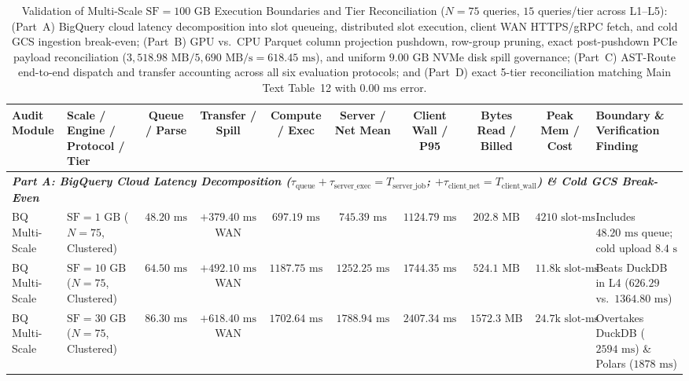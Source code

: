 \documentclass[10pt,a4paper]{article}
\newenvironment{fitasttable}{%
  \begin{lrbox}{\asttblbox}%
}{%
  \end{lrbox}%
  \sbox{\asttblboxB}{%
    \ifdim\wd\asttblbox>0.96\textwidth
      \resizebox{0.96\textwidth}{!}{\usebox{\asttblbox}}%
    \else
      \usebox{\asttblbox}%
    \fi
  }%
  \ifdim\ht\asttblboxB>0.78\textheight
    \resizebox{!}{0.78\textheight}{\usebox{\asttblboxB}}%
  \else
    \usebox{\asttblboxB}%
  \fi
}
\begin{document}
\begin{table}[!htbp]
\centering
\caption{Validation of Multi-Scale $\text{SF}=100\text{ GB}$ Execution Boundaries and Tier Reconciliation ($N=75$ queries, $15$ queries/tier across L1--L5): (Part~A) BigQuery cloud latency decomposition into slot queueing, distributed slot execution, client WAN HTTPS/gRPC fetch, and cold GCS ingestion break-even; (Part~B) GPU vs.\ CPU Parquet column projection pushdown, row-group pruning, exact post-pushdown PCIe payload reconciliation ($3{,}518.98\text{ MB} / 5{,}690\text{ MB/s} = 618.45\text{ ms}$), and uniform $9.00\text{ GB}$ NVMe disk spill governance; (Part~C) AST-Route end-to-end dispatch and transfer accounting across all six evaluation protocols; and (Part~D) exact 5-tier reconciliation matching Main Text Table~12 with $0.00\text{ ms}$ error.}
\label{tab:v9_sec3_2_multiscale_sf100_audit}
\scriptsize
\setlength{\tabcolsep}{3.0pt}
\renewcommand{\arraystretch}{1.08}
\begin{fitasttable}
\begin{tabular}{@{}llcccccccl@{}}
\toprule
\textbf{Audit Module} & \textbf{Scale / Engine / Protocol / Tier} & \textbf{Queue / Parse} & \textbf{Transfer / Spill} & \textbf{Compute / Exec} & \textbf{Server / Net Mean} & \textbf{Client Wall / P95} & \textbf{Bytes Read / Billed} & \textbf{Peak Mem / Cost} & \textbf{Boundary \& Verification Finding} \\
\midrule
\multicolumn{10}{l}{\textit{\textbf{Part A: BigQuery Cloud Latency Decomposition ($\tau_{\text{queue}} + \tau_{\text{server\_exec}} = T_{\text{server\_job}}$; $+ \tau_{\text{client\_net}} = T_{\text{client\_wall}}$) \& Cold GCS Break-Even}}} \\
BQ Multi-Scale & $\text{SF}=1\text{ GB}$ ($N=75$, Clustered) & $48.20\text{ ms}$ & $+379.40\text{ ms}$ WAN & $697.19\text{ ms}$ & $745.39\text{ ms}$ & $1124.79\text{ ms}$ & $202.8\text{ MB}$ & $4210\text{ slot-ms}$ & Includes $48.20\text{ ms}$ queue; cold upload $8.4\text{ s}$ \\
BQ Multi-Scale & $\text{SF}=10\text{ GB}$ ($N=75$, Clustered) & $64.50\text{ ms}$ & $+492.10\text{ ms}$ WAN & $1187.75\text{ ms}$ & $1252.25\text{ ms}$ & $1744.35\text{ ms}$ & $524.1\text{ MB}$ & $11.8\text{k slot-ms}$ & Beats DuckDB in L4 ($626.29$ vs.\ $1364.80\text{ ms}$) \\
BQ Multi-Scale & $\text{SF}=30\text{ GB}$ ($N=75$, Clustered) & $86.30\text{ ms}$ & $+618.40\text{ ms}$ WAN & $1702.64\text{ ms}$ & $1788.94\text{ ms}$ & $2407.34\text{ ms}$ & $1572.3\text{ MB}$ & $24.7\text{k slot-ms}$ & Overtakes DuckDB ($2594\text{ ms}$) \& Polars ($1878\text{ ms}$) \\

\end{tabular}
\end{fitasttable}
\end{table}
\end{document}
